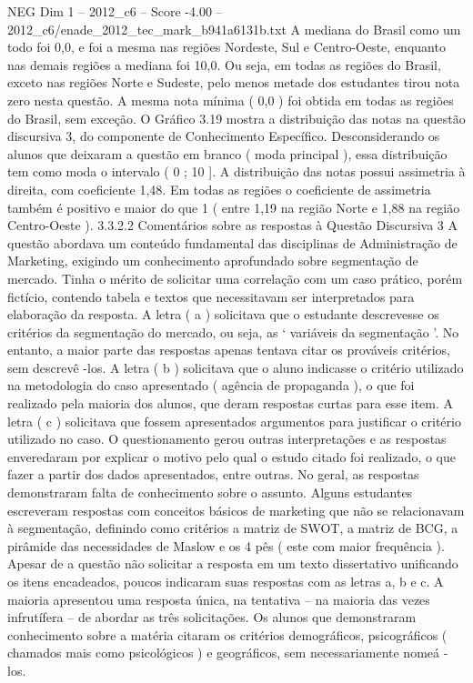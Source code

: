 \begin{textsample}{NEG Dim 1 – 2012\_c6 – Score -4.00 – 2012\_c6/enade\_2012\_tec\_mark\_b941a6131b.txt}
A mediana do Brasil como um todo foi 0,0, e foi a mesma nas regiões Nordeste, Sul e Centro-Oeste, enquanto nas demais regiões a mediana foi 10,0.
Ou seja, em todas as regiões do Brasil, exceto nas regiões Norte e Sudeste, pelo menos metade dos estudantes tirou nota zero nesta questão.
A mesma nota mínima ( 0,0 ) foi obtida em todas as regiões do Brasil, sem exceção.
O Gráfico 3.19 mostra a distribuição das notas na questão discursiva 3, do componente de Conhecimento Específico.
Desconsiderando os alunos que deixaram a questão em branco ( moda principal ), essa distribuição tem como moda o intervalo ( 0 ; 10 ].
A distribuição das notas possui assimetria à direita, com coeficiente 1,48.
Em todas as regiões o coeficiente de assimetria também é positivo e maior do que 1 ( entre 1,19 na região Norte e 1,88 na região Centro-Oeste ). 3.3.2.2 Comentários sobre as respostas à Questão Discursiva 3 A questão abordava um conteúdo fundamental das disciplinas de Administração de Marketing, exigindo um conhecimento aprofundado sobre segmentação de mercado.
Tinha o mérito de solicitar uma correlação com um caso prático, porém fictício, contendo tabela e textos que necessitavam ser interpretados para elaboração da resposta.
A letra ( a ) solicitava que o estudante descrevesse os critérios da segmentação do mercado, ou seja, as ‘ variáveis da segmentação ’.
No entanto, a maior parte das respostas apenas tentava citar os prováveis critérios, sem descrevê -los.
A letra ( b ) solicitava que o aluno indicasse o critério utilizado na metodologia do caso apresentado ( agência de propaganda ), o que foi realizado pela maioria dos alunos, que deram respostas curtas para esse item.
A letra ( c ) solicitava que fossem apresentados argumentos para justificar o critério utilizado no caso.
O questionamento gerou outras interpretações e as respostas enveredaram por explicar o motivo pelo qual o estudo citado foi realizado, o que fazer a partir dos dados apresentados, entre outras.
No geral, as respostas demonstraram falta de conhecimento sobre o assunto.
Alguns estudantes escreveram respostas com conceitos básicos de marketing que não se relacionavam à segmentação, definindo como critérios a matriz de SWOT, a matriz de BCG, a pirâmide das necessidades de Maslow e os 4 pês ( este com maior frequência ).
Apesar de a questão não solicitar a resposta em um texto dissertativo unificando os itens encadeados, poucos indicaram suas respostas com as letras a, b e c.
A maioria apresentou uma resposta única, na tentativa – na maioria das vezes infrutífera – de abordar as três solicitações.
Os alunos que demonstraram conhecimento sobre a matéria citaram os critérios demográficos, psicográficos ( chamados mais como psicológicos ) e geográficos, sem necessariamente nomeá -los.

\end{textsample}
